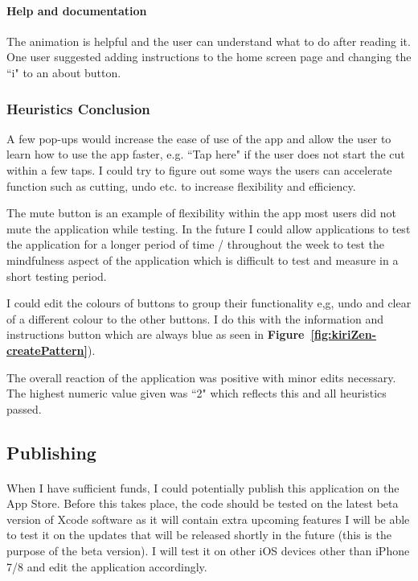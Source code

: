 \documentclass[11pt]{article}
\begin{document}
                \paragraph{Help and documentation} 
                The animation is helpful and the user can understand what to do after reading it. One user suggested adding instructions to the home screen page and changing the ``i" to an about button.
                
                \subsubsection{Heuristics Conclusion}
                A few pop-ups would increase the ease of use of the app and allow the user to learn how to use the app faster, e.g. ``Tap here" if the user does not start the cut within a few taps. I could try to figure out some ways the users can accelerate function such as cutting, undo etc. to increase flexibility and efficiency. 
                
                The mute button is an example of flexibility within the app most users did not mute the application while testing. In the future I could allow applications to test the application for a longer period of time / throughout the week to test the mindfulness aspect of the application which is difficult to test and measure in a short testing period. 
                
                 I could edit the colours of buttons to group their functionality e,g, undo and clear of a different colour to the other buttons. I do this with the information and instructions button which are always blue as seen in \textbf{Figure~\ref{fig:kiriZen-createPattern}}).
                
                The overall reaction of the application was positive with minor edits necessary. The highest numeric value given was ``2" which reflects this and all heuristics passed. 
                
        

    \subsection{Publishing}
        \paragraph{}
        When I have sufficient funds, I could potentially publish this application on the App Store. Before this takes place, the code should be tested on the latest beta version of Xcode software as it will contain extra upcoming features I will be able to test it on the updates that will be released shortly in the future (this is the purpose of the beta version). I will test it on other iOS devices other than iPhone 7/8 and edit the application accordingly.
        
\end{document}
